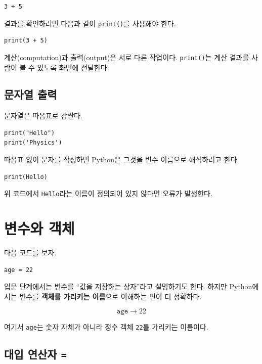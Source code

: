 \documentclass[11pt,a4paper]{article}
\begin{document}
\begin{lstlisting}
3 + 5
\end{lstlisting}

결과를 확인하려면 다음과 같이 \texttt{print()}를 사용해야 한다.

\begin{lstlisting}
print(3 + 5)
\end{lstlisting}

\begin{importantbox}
계산(computation)과 출력(output)은 서로 다른 작업이다.
\texttt{print()}는 계산 결과를 사람이 볼 수 있도록 화면에 전달한다.
\end{importantbox}

\subsection{문자열 출력}

문자열은 따옴표로 감싼다.

\begin{lstlisting}
print("Hello")
print('Physics')
\end{lstlisting}

따옴표 없이 문자를 작성하면 Python은 그것을 변수 이름으로 해석하려고 한다.

\begin{lstlisting}
print(Hello)
\end{lstlisting}

위 코드에서 \texttt{Hello}라는 이름이 정의되어 있지 않다면 오류가 발생한다.

\section{변수와 객체}

다음 코드를 보자.

\begin{lstlisting}
age = 22
\end{lstlisting}

입문 단계에서는 변수를 ``값을 저장하는 상자''라고 설명하기도 한다.
하지만 Python에서는 변수를 \textbf{객체를 가리키는 이름}으로 이해하는 편이 더 정확하다.

\[
\texttt{age} \longrightarrow 22
\]

여기서 \texttt{age}는 숫자 자체가 아니라 정수 객체 \texttt{22}를 가리키는 이름이다.

\subsection{대입 연산자 \texttt{=}}
\end{document}
